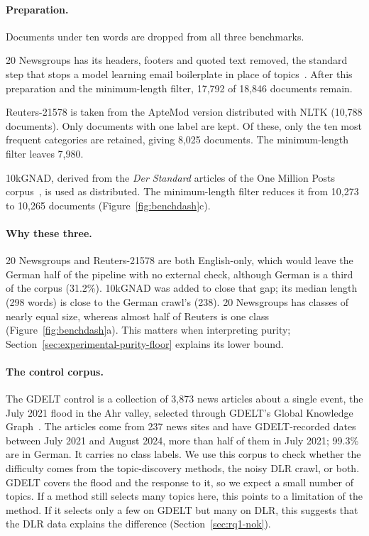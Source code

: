 \begin{samepage}
\paragraph{Preparation.} Documents under ten words are dropped from all three benchmarks.

20 Newsgroups has its headers, footers and quoted text removed, the
standard step that stops a model learning email boilerplate in place of
topics~\cite{sklearn20ng}. After this preparation and the minimum-length filter, 17{,}792 of
18{,}846 documents remain.
\end{samepage}

Reuters-21578 is taken from the ApteMod version distributed with NLTK (10{,}788 documents).
Only documents with one label are kept. Of these, only the ten most frequent categories are
retained, giving 8{,}025 documents. The minimum-length filter leaves 7{,}980.

10kGNAD, derived from the \emph{Der Standard} articles of the One Million Posts
corpus~\cite{schabus2017million}, is used as distributed. The minimum-length filter reduces
it from 10{,}273 to 10{,}265 documents (Figure~\ref{fig:benchdash}c).

\paragraph{Why these three.} 20 Newsgroups and Reuters-21578 are both English-only, which would
leave the German half of the pipeline with no external check, although German is a third of the
corpus (31.2\%). 10kGNAD was added to close that gap; its median length (298 words) is close to
the German crawl's (238). 20 Newsgroups has classes of nearly equal size, whereas almost half of
Reuters is one class (Figure~\ref{fig:benchdash}a). This matters when interpreting purity; Section~\ref{sec:experimental-purity-floor}
explains its lower bound.

\paragraph{The control corpus.} The GDELT control is a collection of 3{,}873 news articles about
a single event, the July 2021 flood in the Ahr valley, selected through GDELT's Global Knowledge
Graph~\cite{leetaru2013gdelt}. The articles come from 237 news sites and have GDELT-recorded dates
between July 2021 and August 2024, more than half of them in July 2021; 99.3\% are in German. It carries
no class labels. We use this corpus to check whether the difficulty comes from the
topic-discovery methods, the noisy DLR crawl, or both. GDELT covers the flood and the response
to it, so we expect a small number of topics. If a method still selects many topics here, this
points to a limitation of the method. If it selects only a few on GDELT but many on DLR, this
suggests that the DLR data explains the difference (Section~\ref{sec:rq1-nok}).

